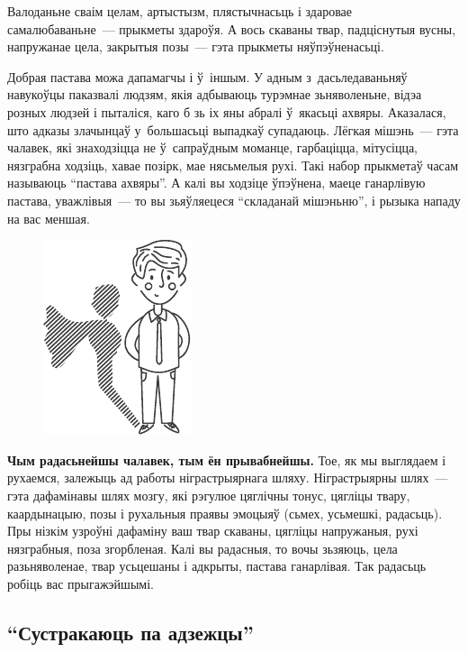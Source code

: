
Валоданьне сваім целам, артыстызм, плястычнасьць і здаровае самалюбаваньне~--- прыкметы здароўя. А вось скаваны твар, падціснутыя вусны, напружанае цела, закрытыя позы~--- гэта прыкметы няўпэўненасьці.

Добрая пастава можа дапамагчы і ў~іншым. У адным з~дасьледаваньняў навукоўцы паказвалі людзям, якія адбываюць турэмнае зьняволеньне, відэа розных людзей і пыталіся, каго б зь іх яны абралі ў~якасьці ахвяры. Аказалася, што адказы злачынцаў у~большасьці выпадкаў супадаюць. Лёгкая мішэнь~--- гэта чалавек, які знаходзіцца не ў~сапраўдным моманце, гарбаціцца, мітусіцца, нязграбна ходзіць, хавае позірк, мае нясьмелыя рухі. Такі набор прыкметаў часам называюць ``пастава ахвяры''. А калі вы ходзіце ўпэўнена, маеце ганарлівую пастава, уважлівыя~--- то вы зьяўляецеся ``складанай мішэньню'', і рызыка нападу на вас меншая.

\begin{figure}[htb!]
  \centering
  \includegraphics[scale=1.5]{willpower/ch9/6.pdf}
\end{figure}

\textbf{Чым радасьнейшы чалавек, тым ён прывабнейшы.} Тое, як мы выглядаем і рухаемся, залежыць ад работы ніграстрыярнага шляху. Ніграстрыярны шлях~--- гэта дафамінавы шлях мозгу, які рэгулюе цяглічны тонус, цягліцы твару, каардынацыю, позы і рухальныя праявы эмоцыяў (сьмех, усьмешкі, радасьць). Пры нізкім узроўні дафаміну ваш твар скаваны, цягліцы напружаныя, рухі нязграбныя, поза згорбленая. Калі вы радасныя, то вочы зьзяюць, цела разьняволенае, твар усьцешаны і адкрыты, пастава ганарлівая. Так радасьць робіць вас прыгажэйшымі.

\subsection*{``Сустракаюць па адзежцы''}

